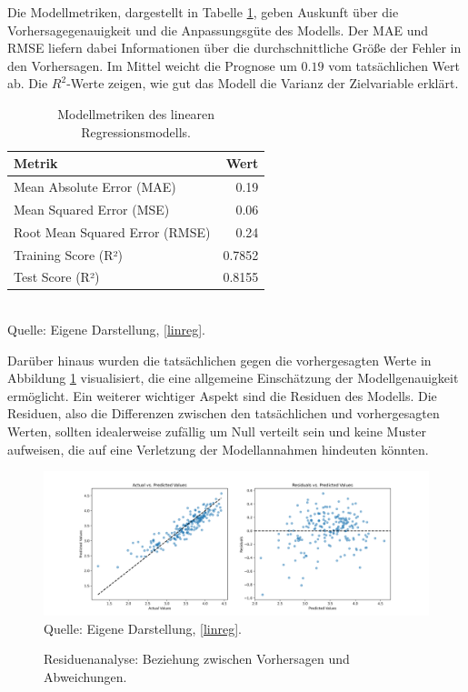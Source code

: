 Die Modellmetriken, dargestellt in Tabelle \ref{tab:model-metrics}, 
geben Auskunft über die Vorhersagegenauigkeit und die Anpassungsgüte des Modells. 
Der MAE und RMSE liefern dabei Informationen über die durchschnittliche Größe 
der Fehler in den Vorhersagen. Im Mittel weicht die Prognose um $0.19$ vom tatsächlichen Wert ab.
Die $R^2$-Werte zeigen, wie gut das Modell die Varianz der Zielvariable erklärt.

\begin{table}[!h]
    \caption{Modellmetriken des linearen Regressionsmodells.}
    \begin{tabularx}{\textwidth}{Xr}
    \toprule
    Metrik & Wert \\
    \midrule
    Mean Absolute Error (MAE) & 0.19 \\
    Mean Squared Error (MSE) & 0.06 \\
    Root Mean Squared Error (RMSE) & 0.24 \\
    Training Score (R²) & 0.7852 \\
    Test Score (R²) & 0.8155 \\
    \bottomrule
    \end{tabularx}
    \label{tab:model-metrics}
    \\ Quelle: Eigene Darstellung, \ref{linreg}.
\end{table}

Darüber hinaus wurden die tatsächlichen gegen die vorhergesagten Werte
in Abbildung \ref{pic:residuals} visualisiert, die eine allgemeine Einschätzung der 
Modellgenauigkeit ermöglicht. Ein weiterer wichtiger Aspekt sind die Residuen des Modells. 
Die Residuen, also die Differenzen zwischen den tatsächlichen und vorhergesagten Werten, 
sollten idealerweise zufällig um Null verteilt sein und keine Muster aufweisen, 
die auf eine Verletzung der Modellannahmen hindeuten könnten.

\begin{figure}[!h]
    \caption{Residuenanalyse: Beziehung zwischen Vorhersagen und Abweichungen.}
    \includegraphics[width=1\textwidth]{../scripts/images/residuals.png}
    Quelle: Eigene Darstellung, \ref{linreg}.
    \label{pic:residuals}
\end{figure}


